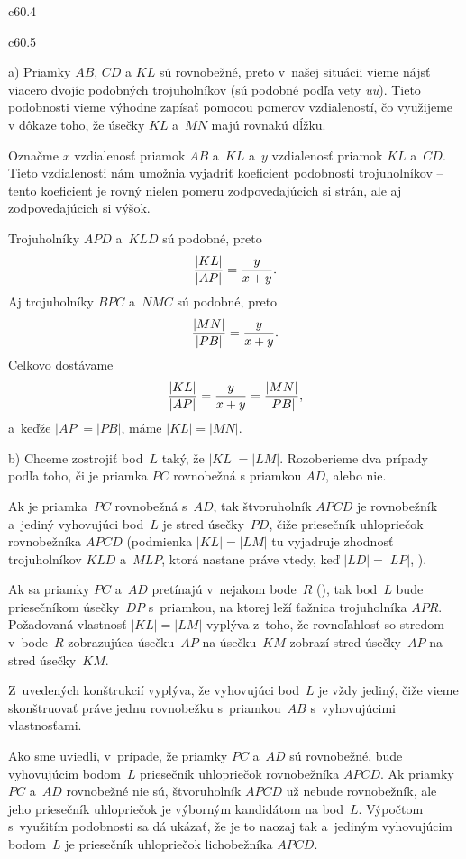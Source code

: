 {%
\epsplace c60.4 \hfil\Obr\par
\epsplace c60.5 \hfil\Obr\par
a)
Priamky $AB$, $CD$ a $KL$ sú rovnobežné, preto v~našej situácii vieme
nájsť viacero dvojíc podobných trojuholníkov (sú podobné podľa vety {\it uu}).
Tieto podobnosti vieme výhodne zapísať pomocou pomerov vzdialeností,
čo využijeme v dôkaze toho, že úsečky $KL$ a~$MN$ majú rovnakú dĺžku.

Označme $x$ vzdialenosť priamok $AB$ a~$KL$ a~$y$ vzdialenosť priamok $KL$ a~$CD$.
Tieto vzdialenosti nám umožnia vyjadriť koeficient podobnosti trojuholníkov --
tento koeficient je rovný nielen pomeru zodpovedajúcich si strán, ale aj zodpovedajúcich si výšok.

Trojuholníky $APD$ a~$KLD$ sú podobné, preto
$$
{|KL|\over |AP|}={y\over x+y}.
$$
Aj trojuholníky $BPC$ a~$NMC$ sú podobné, preto
$$
{|MN|\over |PB|}={y\over x+y}.
$$
Celkovo dostávame
$$
{|KL|\over |AP|}={y\over x+y}={|MN|\over |PB|},
$$
a~keďže $|AP|=|PB|$, máme $|KL|=|MN|$.

\smallskip
b) Chceme zostrojiť bod~$L$ taký, že $|KL|=|LM|$.
Rozoberieme dva prípady podľa toho, či je priamka $PC$ rovnobežná s priamkou $AD$, alebo nie.

Ak je priamka~$PC$ rovnobežná s~$AD$,
tak štvoruholník $APCD$ je rovnobežník a~jediný vyhovujúci bod~$L$ je stred úsečky~$PD$, čiže priesečník uhlopriečok rovnobežníka $APCD$ (podmienka $|KL|=|LM|$ tu vyjadruje zhodnosť trojuholníkov $KLD$ a~$MLP$, ktorá nastane práve vtedy, keď $|LD|=|LP|$, \obr).

\twocpictures

Ak sa priamky $PC$ a~$AD$ pretínajú v~nejakom bode~$R$ (\obr),
tak bod~$L$ bude priesečníkom úsečky~$DP$ s~priamkou, na ktorej leží ťažnica trojuholníka $APR$.
Požadovaná vlastnosť $|KL|=|LM|$ vyplýva z~toho, že rovnoľahlosť so stredom v~bode~$R$
zobrazujúca úsečku~$AP$ na úsečku~$KM$ zobrazí stred úsečky~$AP$ na stred úsečky~$KM$.

Z~uvedených konštrukcií vyplýva, že vyhovujúci bod~$L$ je vždy jediný,
čiže vieme skonštruovať práve jednu rovnobežku s~priamkou~$AB$ s~vyhovujúcimi vlastnosťami.

\poznamka
Ako sme uviedli, v~prípade, že priamky $PC$ a~$AD$ sú rovnobežné, bude vyhovujúcim bodom~$L$ priesečník uhlopriečok rovnobežníka $APCD$.
Ak priamky $PC$ a~$AD$ rovnobežné nie sú, štvoruholník $APCD$ už nebude rovnobežník, ale jeho priesečník uhlopriečok je výborným kandidátom
na bod~$L$. Výpočtom s~využitím podobnosti sa dá ukázať, že je to naozaj tak a~jediným vyhovujúcim bodom~$L$ je priesečník uhlopriečok lichobežníka $APCD$.

}
